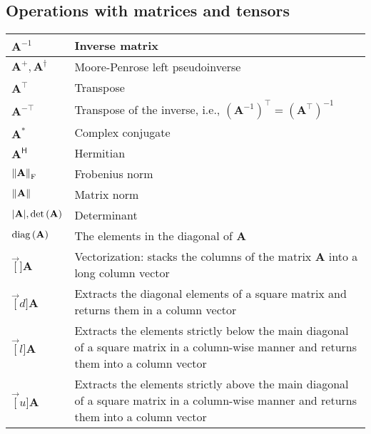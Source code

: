 \documentclass{article}
\begin{document}
\subsection{Operations with matrices and tensors}
\begin{xltabular}{\textwidth}{XX}
    \(\mathbf{A}^{-1}\)                                               & Inverse matrix\\ \hline
    \(\mathbf{A}^+, \mathbf{A}^{\dagger}\)                            & Moore-Penrose left pseudoinverse\\ \hline
    \(\mathbf{A}^\top\)                                               & Transpose\\ \hline
    \(\mathbf{A}^{-\top}\)                                            & Transpose of the inverse, i.e., \(\left( \mathbf{A}^{-1} \right)^{\top} = \left( \mathbf{A}^{\top} \right)^{-1}\) \cite{petersenMatrixCookbook2008,golubMatrixComputations2013}\\ \hline
    \(\mathbf{A}^*\) & Complex conjugate\\ \hline
    \(\mathbf{A}^\mathsf{H}\)                                         & Hermitian\\ \hline
    \(\norm{\mathbf{A}}_\textrm{F}\)                                             & Frobenius norm \\ \hline
    \(\norm{\mathbf{A}}\)                                             & Matrix norm\\ \hline
    \(\abs{\mathbf{A}}, \textnormal{det}\left( \mathbf{A} \right)\)   & Determinant\\ \hline
    \(\operatorname{diag}\left(\mathbf{A}\right)\)                                             & The elements in the diagonal of \(\mathbf{A}\) \\ \hline
    \(\vec[]{\mathbf{A}}\)                                            & Vectorization: stacks the columns of the matrix \(\mathbf{A}\) into a long column vector\\ \hline
    \(\vec[d]{\mathbf{A}}\)                                           & Extracts the diagonal elements of a square matrix and returns them
    in a column vector\\ \hline
    \(\vec[l]{\mathbf{A}}\)                                           & Extracts the elements strictly below the main diagonal of a square matrix in a column-wise manner and returns them into a column vector\\ \hline
    \(\vec[u]{\mathbf{A}}\)                                           & Extracts the elements strictly above the main diagonal of a square matrix in a column-wise manner and returns them into a column vector\\ \hline

\end{xltabular}
\end{document}
